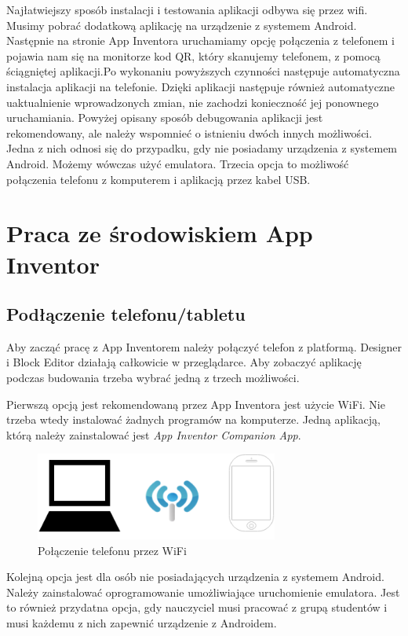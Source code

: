 Najłatwiejszy sposób instalacji i testowania aplikacji odbywa się przez wifi. Musimy pobrać dodatkową aplikację na urządzenie z systemem Android. Następnie na stronie App Inventora uruchamiamy opcję połączenia z telefonem i pojawia nam się na monitorze kod QR, który skanujemy telefonem, z pomocą ściągniętej aplikacji.Po wykonaniu powyższych czynności następuje automatyczna instalacja aplikacji na telefonie. Dzięki aplikacji następuje również automatyczne uaktualnienie wprowadzonych zmian, nie zachodzi konieczność jej ponownego uruchamiania. 
Powyżej opisany sposób debugowania aplikacji jest rekomendowany, ale należy wspomnieć o istnieniu dwóch innych możliwości. Jedna z nich odnosi się do przypadku, gdy nie posiadamy urządzenia z systemem Android. Możemy wówczas użyć emulatora. Trzecia opcja to możliwość połączenia telefonu z komputerem i aplikacją przez kabel USB. 

\section{Praca ze środowiskiem App Inventor}

\subsection{Podłączenie telefonu/tabletu}

Aby zacząć pracę z App Inventorem należy połączyć telefon z platformą. Designer i Block Editor działają całkowicie w przeglądarce. Aby zobaczyć aplikację podczas budowania trzeba wybrać jedną z trzech możliwości.\cite{android:40}

Pierwszą opcją jest rekomendowaną przez App Inventora jest użycie WiFi. Nie trzeba wtedy instalować żadnych programów na komputerze. Jedną aplikacją, którą należy zainstalować jest \emph{App Inventor Companion App}.

\begin{figure}[H] 
\centering\includegraphics[width=8cm]{figures/option1wifi}
\caption{Połączenie telefonu przez WiFi}
\end{figure}

Kolejną opcja jest dla osób nie posiadających urządzenia z systemem Android. Należy zainstalować oprogramowanie umożliwiające uruchomienie emulatora. Jest to również przydatna opcja, gdy nauczyciel musi pracować z grupą studentów i musi każdemu z nich zapewnić urządzenie z Androidem.\cite{android:40}

